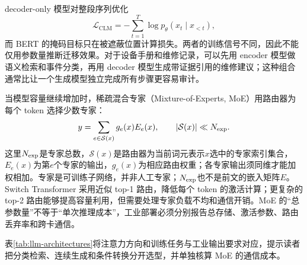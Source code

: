 decoder-only 模型对整段序列优化
\begin{equation}
 \mathcal{L}_{\mathrm{CLM}}=-\sum_{t=1}^{T}\log p_\theta(x_t\mid x_{<t}),
\end{equation}
而 BERT 的掩码目标只在被遮蔽位置计算损失。两者的训练信号不同，因此不能仅用参数量推断迁移效果。对于设备手册和维修记录，可以先用 encoder 模型做语义检索和事件分类，再用 decoder 模型生成带证据引用的维修建议；这种组合通常比让一个生成模型独立完成所有步骤更容易审计。

当模型容量继续增加时，稀疏混合专家（Mixture-of-Experts, MoE）用路由器为每个 token 选择少数专家：
\begin{equation}
 y=\sum_{e\in\mathcal{S}(x)}g_e(x)E_e(x),\qquad |\mathcal{S}(x)|\ll N_{\rm exp}.
\end{equation}
这里$N_{\rm exp}$是专家总数，$\mathcal S(x)$是路由器为当前词元表示$x$选中的专家索引集合，$E_e(x)$为第$e$个专家的输出，$g_e(x)$为相应路由权重；各专家输出须同维才能加权相加。专家是可训练子网络，并非人工专家；$N_{\rm exp}$也不是前文的嵌入矩阵$E$。
Switch Transformer 采用近似 top-1 路由，降低每个 token 的激活计算；更复杂的 top-2 路由能够提高容量利用，但需要处理专家负载不均和通信开销。MoE 的“总参数量”不等于“单次推理成本”，工业部署必须分别报告总存储、激活参数、路由丢弃率和跨卡通信。

\begin{table}[htbp]
\centering
\caption{语言模型架构与工业任务匹配}
\label{tab:llm-architectures}
\scriptsize
\setlength{\tabcolsep}{3pt}
\end{table}

表\ref{tab:llm-architectures}将注意力方向和训练任务与工业输出要求对应，提示读者把分类检索、连续生成和条件转换分开选型，并单独核算 MoE 的通信成本。
